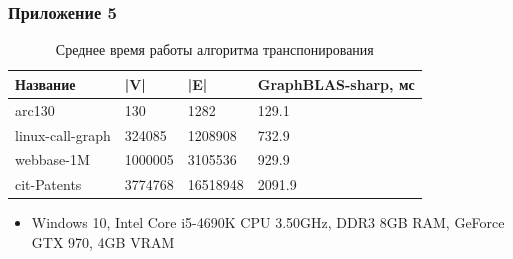 \documentclass{beamer}
\begin{document}
\begin{frame}  
  \frametitle{Приложение 5}
  \begin{table}[htbp]
    \begin{tabularx}{\textwidth}{X|l|l|X}
      Название & |V| & |E| & GraphBLAS-sharp, мс \\
      \hline
      arc130 & 130 & 1282 & 129.1 \\
      linux-call-graph & 324085 & 1208908 & 732.9 \\
      webbase-1M & 1000005 & 3105536 & 929.9 \\
      cit-Patents & 3774768 & 16518948 & 2091.9 \\ 
      \hline
    \end{tabularx}
  \caption{Среднее время работы алгоритма транспонирования}
  \end{table}
  \begin{itemize}
    \item Windows 10, Intel Core i5-4690K CPU 3.50GHz, DDR3 8GB RAM, GeForce GTX 970, 4GB VRAM
  \end{itemize}
\end{frame} 
\end{document}

